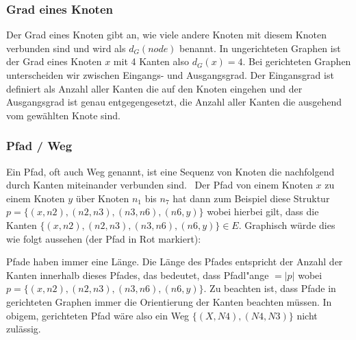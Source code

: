 \subsubsection{Grad eines Knoten}

Der Grad eines Knoten gibt an, wie viele andere Knoten mit diesem Knoten verbunden sind und wird als $d_G(node)$ benannt.
In ungerichteten Graphen ist der Grad eines Knoten $x$ mit 4 Kanten also $d_G(x) = 4$.
Bei gerichteten Graphen unterscheiden wir zwischen Eingangs- und Ausgangsgrad.
Der Eingansgrad ist definiert als Anzahl aller Kanten die auf den Knoten eingehen und der Ausgangsgrad ist genau entgegengesetzt,
die Anzahl aller Kanten die ausgehend vom gewählten Knote sind.

\subsubsection{Pfad / Weg}

Ein Pfad, oft auch Weg genannt, ist eine Sequenz von Knoten die nachfolgend durch Kanten miteinander verbunden sind.~\cite[vgl. S. 7 0.3]{graphentheorie}
Der Pfad von einem Knoten $x$ zu einem Knoten $y$ über Knoten $n_1$ bis $n_7$ hat dann zum Beispiel diese
Struktur $p = \{(x, n2), (n2, n3), (n3, n6), (n6, y)\}$ wobei hierbei gilt,
dass die Kanten $\{(x, n2), (n2, n3), (n3, n6), (n6, y)\} \in E$.
Graphisch würde dies wie folgt aussehen (der Pfad in Rot markiert):


Pfade haben immer eine Länge.
Die Länge des Pfades entspricht der Anzahl der Kanten innerhalb dieses Pfades, das bedeutet, dass Pfadl"ange $ = |p|$ wobei $p = \{(x, n2), (n2, n3), (n3, n6), (n6, y)\}$.
Zu beachten ist, dass Pfade in gerichteten Graphen immer die Orientierung der Kanten beachten müssen.
In obigem, gerichteten Pfad wäre also ein Weg $ \{ (X,N4), (N4, N3) \} $ nicht zulässig.

